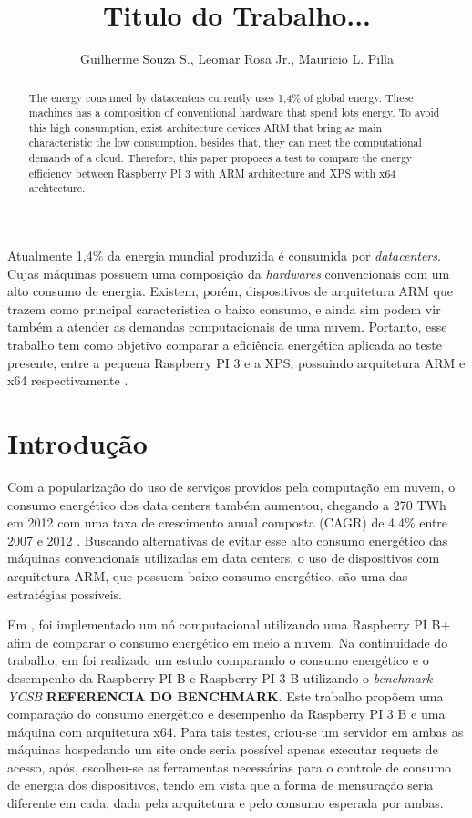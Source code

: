 \documentclass[12pt]{article}
\title{Titulo do Trabalho...}
\author{Guilherme Souza S.\inst{1}, Leomar Rosa Jr.\inst{1}, Mauricio L. Pilla\inst{1} }
\begin{document}
 
\maketitle

\begin{abstract}
  The energy consumed by datacenters currently uses 1,4\% of global energy. %
  These machines has a composition of conventional hardware that spend lots energy. 
  To avoid this high consumption, exist architecture devices ARM that bring as main characteristic the low consumption, besides that, they can meet the computational demands of a cloud. 
  Therefore, this paper proposes a test to compare the energy efficiency between Raspberry PI 3 with ARM architecture and XPS with x64 archtecture. 
\end{abstract}
     
\begin{resumo} 
  Atualmente 1,4\% da energia mundial produzida é consumida por \textit{datacenters}. Cujas máquinas possuem uma composição da \textit{hardwares} convencionais com um alto consumo de energia. Existem, porém, dispositivos de arquitetura ARM que trazem como principal caracteristica o baixo consumo, e ainda sim podem vir também a atender as demandas computacionais de uma nuvem. Portanto, esse trabalho tem como objetivo comparar a eficiência energética aplicada ao teste presente, entre a pequena Raspberry PI 3 e a XPS, possuindo arquitetura ARM e x64 respectivamente .
\end{resumo}


\section{Introdução}
  Com a popularização do uso de serviços providos pela computação em nuvem, o consumo energético dos data centers também aumentou, chegando a 270 TWh em 2012 com uma taxa de crescimento anual composta (CAGR) de 4.4\% entre 2007 e 2012 \cite{VanHeddeghem:2014:TWI:2657027.2657141}. Buscando alternativas de evitar esse alto consumo energético das máquinas convencionais utilizadas em data centers, o uso de dispositivos com arquitetura ARM, que possuem baixo consumo energético, são uma das estratégias possíveis.


  Em \cite{Joao}, foi implementado um nó computacional utilizando uma Raspberry PI B+ afim de comparar o consumo energético em meio a nuvem.
  Na continuidade do trabalho, em \cite{eu} foi realizado um estudo comparando o consumo energético e o desempenho da Raspberry PI B e Raspberry PI 3 B utilizando o \textit{benchmark YCSB}  \textbf{REFERENCIA DO BENCHMARK}. Este trabalho propõem uma comparação do consumo energético e desempenho da Raspberry PI 3 B e uma máquina com arquitetura x64. Para tais testes, criou-se um servidor em ambas as máquinas hospedando um site onde seria possível apenas executar requets de acesso, após, escolheu-se as ferramentas necessárias para o controle de consumo de energia dos dispositivos, tendo em vista que a forma de mensuração seria diferente em cada, dada pela arquitetura e pelo consumo esperada por ambas.
\end{document}
